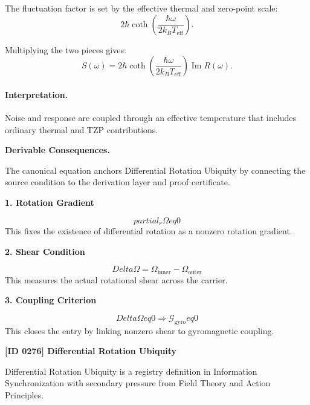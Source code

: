 The fluctuation factor is set by the effective thermal and zero-point scale:
\begin{equation}
2\hbar
\coth\left(
\frac{\hbar\omega}{2k_B T_{\mathrm{eff}}}
\right).
\end{equation}

Multiplying the two pieces gives:
\begin{equation}
\boxed{
S(\omega)
=
2\hbar
\coth\left(
\frac{\hbar\omega}{2k_B T_{\mathrm{eff}}}
\right)
\operatorname{Im}R(\omega).
}
\end{equation}

\paragraph{Interpretation.}
Noise and response are coupled through an effective temperature that includes ordinary thermal and TZP contributions.

\par\vspace{0.35em}
\noindent\textbf{Derivable Consequences.}\quad
\begingroup
\footnotesize
\raggedright
The canonical equation anchors Differential Rotation Ubiquity by connecting the source condition to the derivation layer and proof certificate.
\par\endgroup

\noindent\textbf{1. Rotation Gradient}\par
\[
partial_r \Omega  eq 0
\]
\noindent This fixes the existence of differential rotation as a nonzero rotation gradient.\par
\noindent\textbf{2. Shear Condition}\par
\[
Delta \Omega = \Omega_{\mathrm{inner}} - \Omega_{\mathrm{outer}}
\]
\noindent This measures the actual rotational shear across the carrier.\par
\noindent\textbf{3. Coupling Criterion}\par
\[
Delta \Omega  eq 0 \Longrightarrow \mathcal{G}_{\mathrm{gyro}}  eq 0
\]
\noindent This closes the entry by linking nonzero shear to gyromagnetic coupling.\par

\clearpage
\noindent\textbf{[ID 0276] Differential Rotation Ubiquity}\par
\vspace{0.35em}
\begingroup\small
{}
Differential Rotation Ubiquity is a registry definition in Information Synchronization with secondary pressure from Field Theory and Action Principles.

